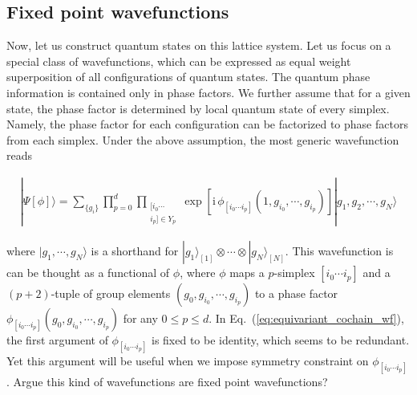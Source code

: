 \documentclass[reprint,amsmath,amssymb,aps,pra,]{revtex4-1}
\newcommand{\ii}{\mathrm{i}\,} %
\begin{document}
\subsection{Fixed point wavefunctions}
Now, let us construct quantum states on this lattice system.
Let us focus on a special class of wavefunctions, which can be expressed as equal weight superposition of all configurations of quantum states.
The quantum phase information is contained only in phase factors.
We further assume that for a given state, the phase factor is determined by local quantum state of every simplex. 
Namely, the phase factor for each configuration can be factorized to phase factors from each simplex.
Under the above assumption, the most generic wavefunction reads
\begin{widetext}
  \begin{align}
    |\Psi[\phi]\rangle=\sum_{\{g_i\}}\prod_{p=0}^d \prod_{\substack{[i_0 \cdots\\ i_{p}]\in Y_p}} \exp\left[ \ii \phi_{[i_0\cdots i_{p}]}(1,g_{i_0},\cdots,g_{i_{p}}) \right] |g_1,g_2,\cdots,g_N\rangle
    \label{eq:equivariant_cochain_wf}
  \end{align}
\end{widetext}
where $|g_1,\cdots,g_N\rangle$ is a shorthand for $|g_1\rangle_{[1]}\otimes\cdots\otimes|g_N\rangle_{[N]}$.
This wavefunction is can be thought as a functional of $\phi$, where $\phi$ maps a $p$-simplex $[i_0\cdots i_{p}]$ and a $(p+2)$-tuple of group elements $(g_0,g_{i_0},\cdots,g_{i_{p}})$ to a phase factor $\phi_{[i_0\cdots i_{p}]}(g_0,g_{i_0},\cdots,g_{i_{p}})$ for any $0\le p\le d$.
In Eq.~(\ref{eq:equivariant_cochain_wf}), the first argument of $\phi_{[i_0\cdots i_{p}]}$ is fixed to be identity, which seems to be redundant.
Yet this argument will be useful when we impose symmetry constraint on $\phi_{[i_0\cdots i_{p}]}$.
{\color{red} Argue this kind of wavefunctions are fixed point wavefunctions?}
\end{document}
